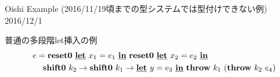 \documentclass[dvipdfmx]{jsarticle}
\newcommand\longer[2]{{#1} \ord {#2}}
\newcommand\uni{\cup} %
\begin{document}
\begin{center}
Oishi Example (2016/11/19頃までの型システムでは型付けできない例) \\
2016/12/1
\end{center}

普通の多段階let挿入の例
\begin{align*}
e &= \textbf{reset0}~\underline{\textbf{let}}~x_1=e_1~\underline{\textbf{in}}~\textbf{reset0}~\underline{\textbf{let}}~x_2=e_2~\underline{\textbf{in}} \\
  &\phantom{=}  \textbf{shift0}~{k_2}\to{\textbf{shift0}~{k_1}\to{\underline{\textbf{let}}~y=e_3~\underline{\textbf{in}}~\textbf{throw}~{k_1}~{(\textbf{throw}~{k_2}~{e_4})}}}
\end{align*}

\newcommand\tzero{\codeT{t}{\gamma_0}}
\newcommand\tone{\codeT{t}{\gamma_1}}
\newcommand\ttwo{\codeT{t}{\gamma_2}}
\newcommand\tthree{\codeT{t}{\gamma_3}}
\newcommand\tonethree{\codeT{t}{\gamma_1\uni\gamma_3}}
\newcommand\tall{\codeT{t}{\gamma_2\uni\gamma_1\uni\gamma_3}}
\newcommand\Gammaone{
\longer{\gamma_1}{\gamma_0},~x_1:\tone \vdash 
       \cLet~x_2=e_2~\cIn~\cdots : \tone;~\tone,\tzero}
\newcommand\Gammatwo{
      \Gamma_1,~k_2:\contT{\ttwo}{\tone}{\tzero},
              ~k_1:\contT{\tone}{\tzero}{\cdot{}}}

\def\proofone{
\infer
{\vdash e:\tzero;~\cdot{}}
{
  \infer{\vdash \cLet~x_1=e_1~\cIn~\Resetz~\cLet~x_2=e_2~\cIn~\cdots :
         \tzero;~\tzero
        }
        {\infer{\longer{\gamma_1}{\gamma_0},~x_1:\tone \vdash 
                \Resetz~\cLet~x_2=e_2~\cIn~\cdots : \tone;~\tzero
               }
               {\prooftwo}
        }
}
}
\def\prooftwo{
\infer{\longer{\gamma_1}{\gamma_0},~x_1:\tone \vdash 
       \cLet~x_2=e_2~\cIn~\cdots : \tone;~\tone,\tzero}
      {\infer{\Gamma_1=\longer{\gamma_2}{\gamma_1},~x_2:\ttwo,~\longer{\gamma_1}{\gamma_0},~x_1:\tone \vdash 
              \shiftz{k_2}{\shiftz{k_1}{\cdots}} : \ttwo;~\tone,\tzero
             }
             {\proofthree}
      }
}

\def\proofthree{
\infer{\Gamma_1,~k_2:\contT{\ttwo}{\tone}{\tzero}
       \vdash \shiftz{k_1}{\cdots} : \tone;~\tzero
      }
      {\infer{\Gamma_2=\Gamma_1,~k_2:\contT{\ttwo}{\tone}{\tzero},
              ~k_1:\contT{\tone}{\tzero}{\cdot{}},
              \vdash \cLet~y=e_3~\cIn~\cdots : \tzero;~\cdot{}
             }
             {\prooffour}
      }
}

\def\prooffour{
\infer[(*)]{\Gamma_3=\Gamma_2,~\longer{\gamma_3}{\gamma_0},~y:\tthree \vdash \throw{k_1}{(\throw{k_2}{e_4})} : 
        \tthree;~\cdot{}}
      {\infer{\Gamma_3 \vdash \throw{k_2}{e_4} : \tonethree;~\tone}
             { \Gamma_3 \vdash e_4 : \tall;~\cdot
             & \infer{\Gamma_3 \models \longer{\gamma_1\uni\gamma_3}{\gamma_1}}{}
             }
      & \infer{\Gamma_3 \models \longer{\gamma_3}{\gamma_0}}{}
      }
}
\end{document}
